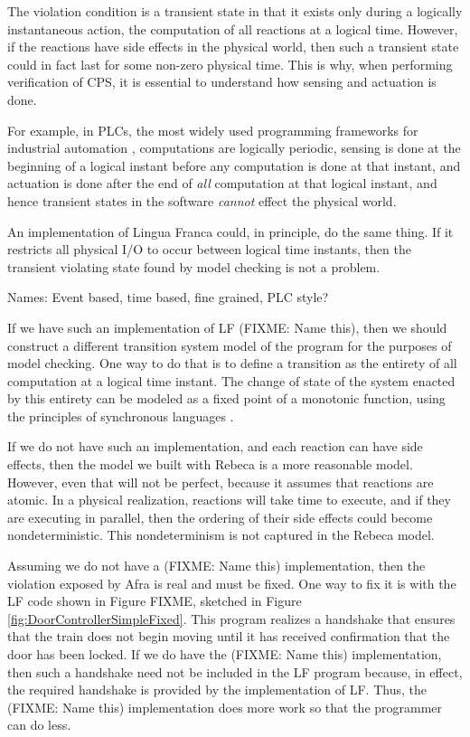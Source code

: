\documentclass{article}
\begin{document}
The violation condition is a transient state in that it exists only during a logically instantaneous action,
the computation of all reactions at a logical time.
However, if the reactions have side effects in the physical world, then such a transient state could
in fact last for some non-zero physical time.
This is why, when performing verification of CPS, it is essential to understand how sensing and
actuation is done.

For example, in PLCs, the most widely used programming frameworks for industrial automation \cite{Stanadard},
computations are logically periodic, sensing is done at the beginning of a logical instant before
any computation is done at that instant, and actuation is done after the end of \emph{all} computation
at that logical instant, and hence transient states in the software \emph{cannot} effect the physical world.

An implementation of Lingua Franca could, in principle, do the same thing.
If it restricts all physical I/O to occur between logical time instants, then the transient violating
state found by model checking is not a problem.

Names: Event based, time based, fine grained, PLC style?

If we have such an implementation of LF (FIXME: Name this), then we should construct a different transition system
model of the program for the purposes of model checking.
One way to do that is to define a transition as the entirety of all computation at a logical time instant.
The change of state of the system enacted by this entirety can be modeled as a fixed point
of a monotonic function, using the principles of synchronous languages \cite{FIXME}.

If we do not have such an implementation, and each reaction can have side effects, then the model
we built with Rebeca is a more reasonable model.
However, even that will not be perfect, because it assumes that reactions are atomic.
In a physical realization, reactions will take time to execute, and if they are executing in parallel,
then the ordering of their side effects could become nondeterministic.
This nondeterminism is not captured in the Rebeca model.

Assuming we do not have a (FIXME: Name this) implementation, then the violation exposed by Afra is real
and must be fixed. One way to fix it is with the LF code shown in Figure FIXME, sketched in
Figure \ref{fig:DoorControllerSimpleFixed}.
This program realizes a handshake that ensures that the train does not begin moving until
it has received confirmation that the door has been locked.
If we do have the (FIXME: Name this) implementation, then such a handshake need not be included
in the LF program because, in effect, the required handshake is provided by the implementation of LF.
Thus, the (FIXME: Name this) implementation does more work so that the programmer can do less.
\end{document}
